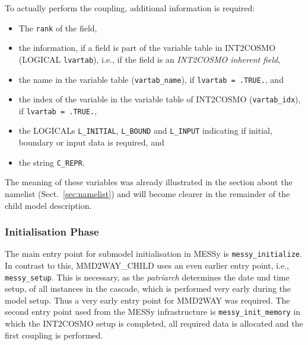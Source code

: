 \documentclass[11pt,twoside]{article}
\begin{document}
To actually perform the coupling, additional information is required: 
\begin{itemize}
\item The \verb|rank| of the field,
\item  the information, if a field is part of the variable 
table in INT2COSMO ({\footnotesize LOGICAL }\verb|lvartab|), i.e., if the
field is an {\it INT2COSMO inherent field},
\item  the name in the variable table 
(\verb|vartab_name|), if \verb|lvartab = .TRUE.|, and 
\item the index of the variable in the variable table of INT2COSMO 
(\verb|vartab_idx|), if \verb|lvartab = .TRUE.|,
\item the {\footnotesize LOGICALs} 
\verb|L_INITIAL|, \verb|L_BOUND| and \verb|L_INPUT| indicating if initial,
boundary or input data is required, and 
\item  the string  \verb|C_REPR|. 
\end{itemize}
The meaning of these variables was already illustrated in the section about the
namelist (Sect.\ \ref{sec:namelist}) and will become clearer in the remainder
of the child model description.


\subsubsection{Initialisation Phase}
The main entry point for submodel initialisation in MESSy is 
\verb|messy_initialize|. In contrast to this, MMD2WAY\_CHILD uses an even
earlier entry point, i.e., \verb|messy_setup|.
This is necessary, as 
the {\it patriarch} determines the date und time
setup, of all instances in the cascade, which is performed very early during the
 model setup. Thus a very early entry point for MMD2WAY was required.
The second entry point used from the MESSy infrastructure
is \verb|messy_init_memory| in which the INT2COSMO setup is completed, all
required data is allocated and the first coupling is performed. 
\end{document}
